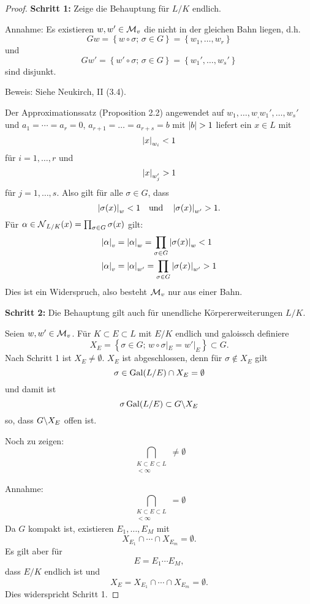 \begin{proof}
	\textbf{Schritt 1:} Zeige die Behauptung für $L/K$ endlich.
	
	\bigskip
	Annahme: Es existieren $w,w' \in \mathcal{M}_v$ die nicht in der gleichen Bahn liegen, d.h.
	\[ Gw = \left\{  w\circ\sigma; \, \sigma \in G \right\}
	= \left\{ w_1, \dots, w_r \right\}
	\]
	und
	\[ Gw' = \left\{  w'\circ\sigma; \, \sigma \in G \right\}
	= \left\{ w_1', \dots, w_s' \right\}
	\]
	sind disjunkt.
	
	Beweis: Siehe Neukirch, II (3.4).
	
	\bigskip
	Der Approximationssatz (Proposition 2.2) angewendet auf $w_1,\dots, w_, w_1', \dots, w_s'$ und
	$a_1= \cdots = a_r =0$, $a_{r+1} = \dots = a_{r+s} = b$ mit $\abs{b}>1$ liefert ein $x\in L$ mit
	\[ \left|{x}\right|_{w_i} < 1
	\]
	für $i=1,\dots, r$ und
	\[ \left|{x}\right|_{w_j'} > 1
	\]
	für $j=1,\dots, s$. Also gilt für alle $\sigma \in G$, dass
	\[ \left|{\sigma(x)}\right|_{w} <1
	\quad \text{und} \quad
	 \left|{\sigma(x)}\right|_{w'} >1.
	\]
	Für $\alpha \in \operatorname{\mathcal{N}}_{L/K} (x) = \prod_{\sigma \in G} \sigma(x)$ gilt:
	\begin{align*}
	\left|{\alpha}\right|_v
	&= \left|{\alpha}\right|_w 
	= \prod_{\sigma \in G} \left|{\sigma(x)}\right|_w
	<1 \\
	\left|{\alpha}\right|_v
	&= \left|{\alpha}\right|_{w'}
	= \prod_{\sigma \in G} \left|{\sigma(x)}\right|_{w'}
	>1
	\end{align*}
	Dies ist ein Widerspruch, also besteht $\mathcal{M}_v$ nur aus einer Bahn.
	
	\bigskip \textbf{Schritt 2:} Die Behauptung gilt auch für unendliche Körpererweiterungen $L/K$.
	
	Seien $w,w' \in \mathcal{M}_v$. Für $K \subset E \subset L$ mit $E/K$ endlich und galoissch definiere
	\[ X_E = \left\{
	\sigma \in G; \, w\circ\sigma|_E = w'|_E
	\right\}
	\subset G.
	\]
	Nach Schritt 1 ist $X_E \neq \emptyset$. $X_E$ ist abgeschlossen, denn für $\sigma \not \in X_E$ gilt
	\[ \sigma \in \operatorname{Gal}(L/E) \cap X_E = \emptyset
	\]
	und damit ist
	\[ \sigma \operatorname{Gal}(L/E) \subset G \backslash X_E
	\]
	so, dass $G \backslash X_E$ offen ist.
	
	\bigskip
	Noch zu zeigen: 
	\[ \bigcap_{\substack{K \subset E\subset L \\ [E/K]< \infty}} \neq \emptyset
	\]
	
	Annahme: 
	\[ \bigcap_{\substack{K \subset E\subset L \\ [E/K]< \infty}} = \emptyset
	\]
	Da $G$ kompakt ist, existieren $E_1, \dots, E_M$ mit
	\[ X_{E_1} \cap \cdots \cap X_{E_m} = \emptyset.
	\]
	Es gilt aber für
	\[ E = E_1 \cdots E_M,
	\]
	dass $E/K$ endlich ist und 
	\[ X_E = X_{E_1} \cap \cdots \cap X_{E_m} = \emptyset.
	\]
	Dies widerspricht Schritt 1.
\end{proof}

